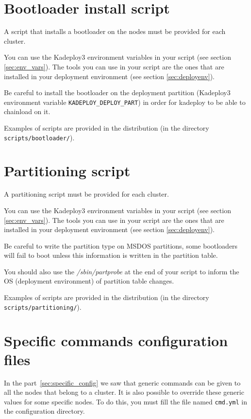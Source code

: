 \documentclass[a4wide,10pt,oneside]{book}
\begin{document}
\section{Bootloader install script}\label{sec:bootscript}
A script that installs a bootloader on the nodes must be provided for each cluster.

You can use the Kadeploy3 environment variables in your script (see section \ref{sec:env_vars}). The tools you can use in your script are the ones that are installed in your deployment environment (see section \ref{sec:deployenv}).

Be careful to install the bootloader on the deployment partition (Kadeploy3 environment variable \texttt{KADEPLOY\_DEPLOY\_PART}) in order for kadeploy to be able to chainload on it.

Examples of scripts are provided in the distribution (in the directory \texttt{scripts/bootloader/}).

\section{Partitioning script}\label{sec:partscript}
A partitioning script must be provided for each cluster.

You can use the Kadeploy3 environment variables in your script (see section \ref{sec:env_vars}). The tools you can use in your script are the ones that are installed in your deployment environment (see section \ref{sec:deployenv}).

Be careful to write the partition type on MSDOS partitions, some bootloaders will fail to boot unless this information is written in the partition table.

You should also use the \emph{/sbin/partprobe} at the end of your script to inform the OS (deployment environment) of partition table changes.

Examples of scripts are provided in the distribution (in the directory \texttt{scripts/partitioning/}).

\section{Specific commands configuration files}
In the part~\ref{sec:specific_config} we saw that generic commands can be given to all the nodes that belong to a cluster. It is also possible to override these generic values for some specific nodes. To do this, you must fill the file named \texttt{cmd.yml} in the configuration directory.
\end{document}

